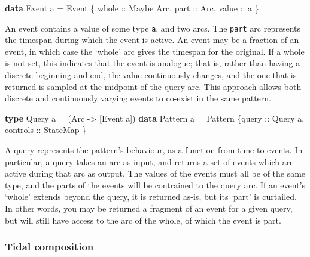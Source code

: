 \documentclass[
]{article}
\newenvironment{Shaded}{\begin{snugshade}}{\end{snugshade}}
\newcommand{\DataTypeTok}[1]{\textcolor[rgb]{0.13,0.29,0.53}{#1}}
\newcommand{\KeywordTok}[1]{\textcolor[rgb]{0.13,0.29,0.53}{\textbf{#1}}}
\newcommand{\NormalTok}[1]{#1}
\newcommand{\OtherTok}[1]{\textcolor[rgb]{0.56,0.35,0.01}{#1}}
\begin{document}
\begin{Shaded}
\begin{Highlighting}[]
\KeywordTok{data} \DataTypeTok{Event}\NormalTok{ a }\OtherTok{=} \DataTypeTok{Event}\NormalTok{ \{}
\OtherTok{    whole ::} \DataTypeTok{Maybe} \DataTypeTok{Arc}\NormalTok{,}
\OtherTok{    part ::} \DataTypeTok{Arc}\NormalTok{,}
\OtherTok{    value ::}\NormalTok{ a}
\NormalTok{\}}
\end{Highlighting}
\end{Shaded}

An event contains a value of some type \texttt{a}, and two arcs. The
\texttt{part} arc represents the timespan during which the event is
active. An event may be a fraction of an event, in which case the
`whole' arc gives the timespan for the original. If a whole is not set,
this indicates that the event is analogue; that is, rather than having a
discrete beginning and end, the value continuously changes, and the one
that is returned is sampled at the midpoint of the query arc. This
approach allows both discrete and continuously varying events to
co-exist in the same pattern.

\begin{Shaded}
\begin{Highlighting}[]
\KeywordTok{type} \DataTypeTok{Query}\NormalTok{ a }\OtherTok{=}\NormalTok{ (}\DataTypeTok{Arc} \OtherTok{{-}>}\NormalTok{ [}\DataTypeTok{Event}\NormalTok{ a])}
\KeywordTok{data} \DataTypeTok{Pattern}\NormalTok{ a }\OtherTok{=} \DataTypeTok{Pattern}\NormalTok{ \{}\OtherTok{query ::} \DataTypeTok{Query}\NormalTok{ a,}
\OtherTok{                          controls ::} \DataTypeTok{StateMap}
\NormalTok{\}}
\end{Highlighting}
\end{Shaded}

A query represents the pattern's behaviour, as a function from time to
events. In particular, a query takes an arc as input, and returns a set
of events which are active during that arc as output. The values of the
events must all be of the same type, and the parts of the events will be
contrained to the query arc. If an event's `whole' extends beyond the
query, it is returned as-is, but its `part' is curtailed. In other
words, you may be returned a fragment of an event for a given query, but
will still have access to the arc of the whole, of which the event is
part.

\hypertarget{tidal-composition}{%
\subsubsection{Tidal composition}\label{tidal-composition}}
\end{document}
